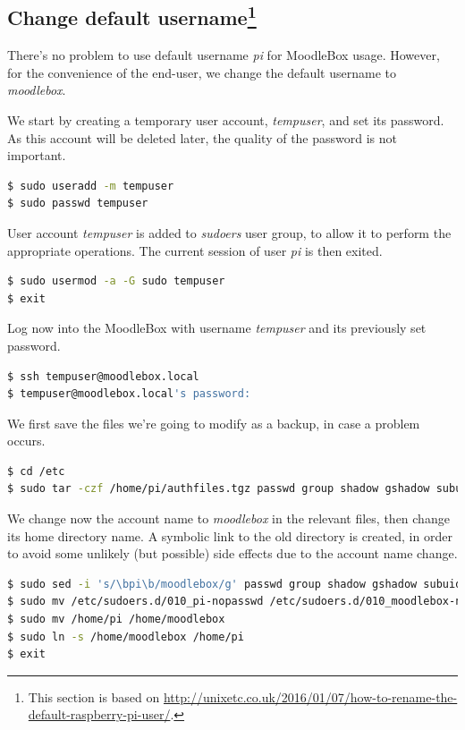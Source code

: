 \documentclass[12pt]{article}
\begin{document}
\subsection[Change default username]{Change default username\footnote{This section is based on \url{http://unixetc.co.uk/2016/01/07/how-to-rename-the-default-raspberry-pi-user/}.}}

There's no problem to use default username \emph{pi} for MoodleBox usage.
However, for the convenience of the end-user, we change the default username to \emph{moodlebox}.

We start by creating a temporary user account, \emph{tempuser}, and set its password.
As this account will be deleted later, the quality of the password is not important.
\begin{lstlisting}[language=bash]
$ sudo useradd -m tempuser
$ sudo passwd tempuser
\end{lstlisting}

User account \emph{tempuser} is added to \emph{sudoers} user group, to allow it to perform the appropriate operations.
The current session of user \textsl{pi} is then exited.
\begin{lstlisting}[language=bash]
$ sudo usermod -a -G sudo tempuser
$ exit
\end{lstlisting}

Log now into the MoodleBox with username \emph{tempuser} and its previously set password.
\begin{lstlisting}[language=bash]
$ ssh tempuser@moodlebox.local
$ tempuser@moodlebox.local's password:
\end{lstlisting}

We first save the files we're going to modify as a backup, in case a problem occurs.
\begin{lstlisting}[language=bash]
$ cd /etc
$ sudo tar -czf /home/pi/authfiles.tgz passwd group shadow gshadow subuid subgid sudoers sudoers.d/010_pi-nopasswd systemd/system/autologin@.service
\end{lstlisting}

We change now the account name to \emph{moodlebox} in the relevant files, then change its home directory name.
A symbolic link to the old directory is created, in order to avoid some unlikely (but possible) side effects due to the account name change.
\begin{lstlisting}[language=bash]
$ sudo sed -i 's/\bpi\b/moodlebox/g' passwd group shadow gshadow subuid subgid sudoers sudoers.d/010_pi-nopasswd systemd/system/autologin@.service
$ sudo mv /etc/sudoers.d/010_pi-nopasswd /etc/sudoers.d/010_moodlebox-nopasswd
$ sudo mv /home/pi /home/moodlebox
$ sudo ln -s /home/moodlebox /home/pi
$ exit
\end{lstlisting}
\end{document}
